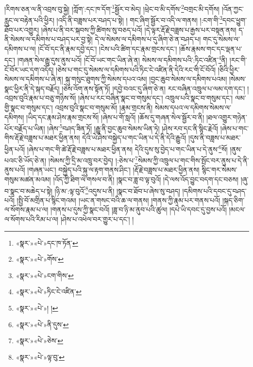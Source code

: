 །རིགས་ཅན་ལ་ནི་འབྲས་བུ་སྐྱེ། །ཀློག་:དང་ཁ་དོག་\footnote{«སྣར་»«པེ་»དང་ཁ་ཏོན་}སྦྱོར་བ་མེད། །ཕྲེང་བ་མི་དགོས་\footnote{«སྣར་»«པེ་»གོས་}བགྲང་མི་དགོས། །འོན་ཀྱང་རླུང་ལ་བརྟེན་པའི་ཕྱིར། །འདི་ནི་བཟླས་པར་བཤད་པ་སྟེ། །
གང་ཞིག་སྦྱོར་བ་འདི་ལ་གནས། །:ངག་གི་\footnote{«སྣར་»«པེ་»ངག་གིས་}དབང་ཕྱུག་ཐོབ་པར་འགྱུར། །ཞེས་པ་ནི་བར་སྐབས་ཀྱི་ཚིགས་སུ་བཅད་པའོ། །དེ་ལྟར་རྡོ་རྗེ་བཟླས་པ་རྒྱས་པར་བསྟན་ནས། ད་ནི་སེམས་ལ་དམིགས་པ་བཤད་པར་བྱ་སྟེ། དེ་ལ་སེམས་ལ་དམིགས་པ་དུ་ཞིག་ཅེ་ན་བཤད་པ། གང་དུ་སེམས་ལ་དམིགས་པ་ལ། །ངོ་བོ་དང་ནི་རྣམ་དབྱེ་དང་། །ངེས་པའི་ཚིག་དང་རྣམ་གྲངས་དང་། །ཆོས་རྣམས་གང་དང་ལྡན་པ་དང་། །གཞན་སེལ་རྒྱུ་དུས་ནུས་པའོ། །ངོ་བོ་ཡང་གང་ཡིན་ཞེ་ན། སེམས་ལ་དམིགས་པའི་:ཏིང་འཛིན་\footnote{«སྣར་»«པེ་»ཏིང་ངེ་འཛིན་}ནི། །རང་གི་ངོ་བོར་ཡང་དག་འདོད། །ཅེས་པ་གང་དུ་སེམས་ལ་དམིགས་པའི་ཏིང་ངེ་འཛིན་ནི་དེའི་རང་གི་ངོ་བོའོ། །ཅིའི་ཕྱིར་སེམས་ལ་དམིགས་པ་ཞེ་ན། སྐུ་གསུང་ཐུགས་ཀྱི་སེམས་དཔའ་འམ། །བྱང་ཆུབ་སེམས་ལ་དམིགས་པའམ། །སེམས་སྣང་ཕྱིར་ནི་དེ་སྐད་བརྗོད། །ཅེས་འོག་ནས་སྟོན་ཏོ། །དབྱེ་བའང་དུ་ཞིག་ཅེ་ན། རང་བཞིན་འཁྲུལ་པ་ལམ་དག་དང་། །འབྲས་བུའི་རྣམ་པ་བཅུ་གཉིས་སོ། །ཞེས་པ་རང་བཞིན་སྣང་བ་གསུམ་དང་། འཁྲུལ་པའི་སྣང་བ་གསུམ་དང་། ལམ་གྱི་སྣང་བ་གསུམ་དང་། འབྲས་བུའི་སྣང་བ་གསུམ་མོ། །རྣམ་གྲངས་ནི། སེམས་དཔའ་ལ་དམིགས་སེམས་ལ་དམིགས། །ཡིད་དང་རྣམ་ཤེས་རྣམ་གྲངས་སོ། །ཞེས་པ་གོ་སླའོ། །ཆོས་དུ་གཞན་སེལ་སྦྱོར་བ་ནི། །ཐལ་འགྱུར་གཉེན་པོར་བརྗོད་པ་ཡིན། །ཞེས་\footnote{«སྣར་»«པེ་»། །}བཤད་ཟིན་ཏོ། །རྒྱུ་ནི་བྱང་ཆུབ་སེམས་ཡིན་ཏེ། །ཤེས་རབ་དང་ནི་སྙིང་རྗེའོ། །ཞེས་པ་གང་གིས་རྡོ་རྗེ་བཟླས་པ་མཐར་ཕྱིན་ནས། དེའི་ཡེ་ཤེས་བསྐྱེད་པ་གང་ཡིན་པ་དེ་ནི་དེའི་རྒྱུའོ། །དུས་ནི་བཟླས་པ་མཐར་ཕྱིན་པའོ། །ཞེས་པ་གང་གི་ཚེ་རྡོ་རྗེ་བཟླས་པ་མཐར་ཕྱིན་ནས། དེའི་དུས་སུ་བྱེད་པ་གང་ཡིན་པ་དེ་ནུས་\footnote{«སྣར་»«པེ་»ནི་དུས་}སོ། །ནུས་པའང་ཅི་ཡོད་ཅེ་ན། །སེམས་ཀྱི་དྲི་མ་འཁྲུ་བར་བྱེད། །:ཅེས་པ་\footnote{«སྣར་»«པེ་»ཅེས་}སེམས་ཀྱི་འཁྲུལ་པ་གང་གིས་སྤོང་བར་ནུས་པ་དེ་ནི་ནུས་པའོ། །གཞན་ཡང་། བསྐྱེད་པའི་སྐུ་ལ་རྟག་གནས་ཤིང་། །རྡོ་རྗེ་བཟླས་པ་མཐར་ཕྱིན་ནས། སྙིང་གར་སེམས་གསུམ་མཚན་མའམ། །འོད་ཀྱི་ཐིག་ལེ་གསལ་བ་ནི། །སྣང་བ་ཟླ་བ་ལྟ་བུའོ། །དེ་ལས་འོད་བྱུང་བདག་དང་བཅས། །ཞུ་བ་སྣང་བ་མཆེད་པ་སྟེ། །ཉི་མ་:ལྟ་བུའོ་\footnote{«སྣར་»«པེ་»ལྟ་བུ་}འདུས་པ་ནི། །སྣང་བ་ཐོབ་པ་ཞེས་སུ་བཤད། །དམིགས་པའི་དབང་དུ་བཤད་པའོ། །སྤྱི་བོ་མགྲིན་པ་སྙིང་གའམ། །ཡང་ན་གསང་བའི་ཆ་ལ་གནས། །གནས་ཀྱི་རྣམ་པར་གནས་པའོ། །སྐད་ཅིག་ལ་སོགས་རྣམ་པ་ལ། །གནས་པ་དུས་ཀྱི་སྣང་བའོ། །ཟླ་བ་ཉི་མ་ནུབ་པའི་ཚུལ། །དཔེ་ཡི་དབང་དུ་བྱས་པའོ། །མངལ་ལ་སོགས་པའི་རིམ་པ་ལ། །ཤེས་པ་འཕེལ་བར་གྱུར་པ་དང་། །
